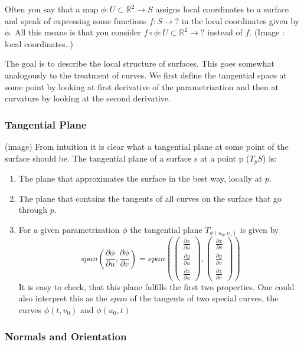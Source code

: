 Often you say that a map $\phi: U \subset \mathbb R^2 \rightarrow S$ assigns local coordinates to a surface and speak of expressing some functions $f:S \rightarrow ?$ in the local coordinates given by $\phi$. All this means is that you consider $f \circ \phi : U \subset \mathbb R^2 \rightarrow ?$ instead of $f$. (Image : local coordinates..) 


The goal is to describe the local structure of surfaces. This goes somewhat analogously to the treatment of curves. We first define the tangential space at some point by looking at first derivative of the parametrization and then at curvature by looking at the second derivative.

\subsubsection{Tangential Plane}

(image)
From intuition it is clear what a tangential plane at some point of the surface should be. The tangential plane of a surface s at a point p ($T_p S$) is:

\begin{enumerate}
	\item The plane that approximates the surface in the best way, locally at $p$.
	\item The plane that contains the tangents of all curves on the surface that go through $p$.
	\item For a given parametrization $\phi$ the tangential plane $T_{\phi(u_0,v_0)}$ is given by
			\[span(\frac{\partial \phi} {\partial u}, \frac{\partial \phi} {\partial v}) = span(\begin{pmatrix}
	\frac{\partial x} {\partial u} \\
	\frac{\partial y} {\partial u}\\
	\frac{\partial z} {\partial u}
\end{pmatrix},\begin{pmatrix}
	\frac{\partial x} {\partial v} \\
	\frac{\partial y} {\partial v}\\
	\frac{\partial z} {\partial v}
\end{pmatrix})\]
	It is easy to check, that this plane fulfills the first two properties. One could also interpret this as the $span$ of the tangents of two special curves, the curves $\phi(t, v_0)$ and $\phi(u_0, t)$
\end{enumerate}

\subsubsection{Normals and Orientation}

